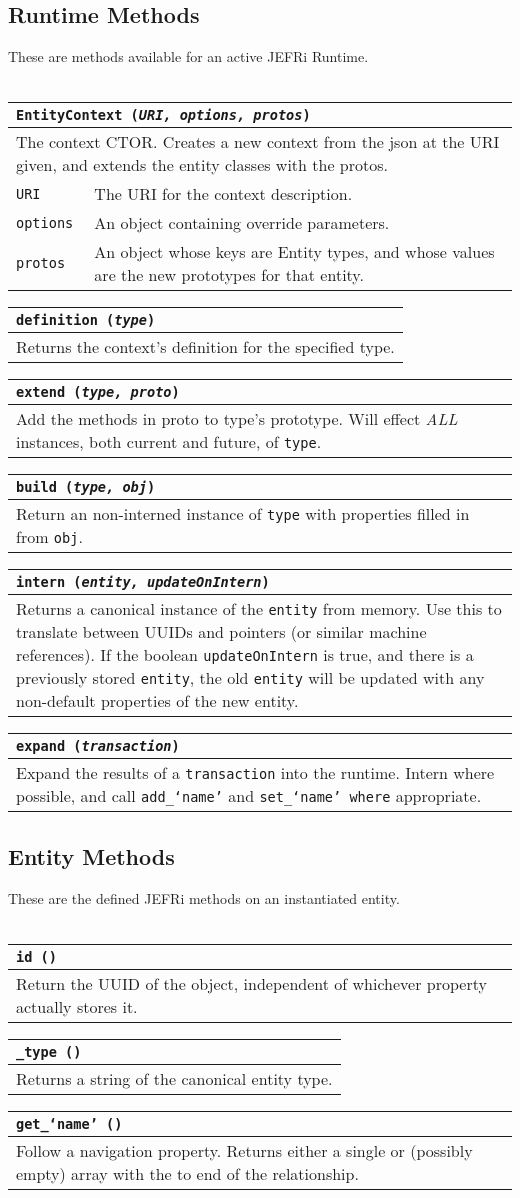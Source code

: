 \documentclass{article}
\newcommand{\ilcode}{\tt}
\newcommand{\method}[4]{
	\noindent
	\begin{tabular}{ | l | p{5in} | }
	\hline
	\multicolumn{2}{|l|}{\large \ilcode #1 ({\it #2})} \\
	\hline
	\multicolumn{2}{|p{6in}|}{#3} \\
	\hline
	#4
	\end{tabular}
}
\newcommand{\param}[2]{
	{\ilcode #1} & #2 \\
	\hline
}
\begin{document}
\subsection{Runtime Methods}
These are methods available for an active JEFRi Runtime.
\\
\\
\method{EntityContext}{URI, options, protos}
{The context CTOR. Creates a new context from the json at the URI given,
	and extends the entity classes with the protos.}
	{
		\param{URI}{The URI for the context description.}
		\param{options}{An object containing override parameters.}
		\param{protos}{An object whose keys are Entity types, and whose values
			are the new prototypes for that entity.}
	}

\method{definition}{type}
	{Returns the context's definition for the specified type.}
	{}

\method{extend}{type, proto}
	{Add the methods in proto to type's prototype. Will effect {\it ALL}
	instances, both current and future, of {\ilcode type}.}{}

\method{build}{type, obj}
	{Return an non-interned instance of {\ilcode type} with properties
	filled in from {\ilcode obj}.}{}

\method{intern}{entity, updateOnIntern}
	{Returns a canonical instance of the {\ilcode entity} from memory. Use this
	to translate between UUIDs and pointers (or similar machine references). If
	the boolean {\ilcode updateOnIntern} is true, and there is a previously
	stored {\ilcode entity}, the old {\ilcode entity} will be updated with any
	non-default properties of the new entity.}{}

\method{expand}{transaction}
	{Expand the results of a {\ilcode transaction} into the runtime. Intern
	where possible, and call {\ilcode add\_`name'} and {\ilcode set\_`name'
	where} appropriate.}{}

\subsection{Entity Methods}
These are the defined JEFRi methods on an instantiated entity.
\\
\\
\method{id}{}
	{Return the UUID of the object, independent of whichever property
			actually stores it.}{}

\method{\_type}{}
	{Returns a string of the canonical entity type.}{}

\method{get\_`name'}{}
	{Follow a navigation property. Returns either a single or (possibly
			empty) array with the to end of the relationship.}{}
\end{document}
